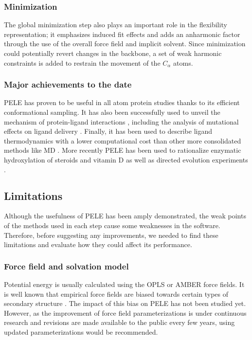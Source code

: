 \subsubsection{Minimization}

The global minimization step also plays an important role in the flexibility representation; it emphasizes induced fit effects and adds an anharmonic factor through the use of the overall force field and implicit solvent. Since minimization could potentially revert changes in the backbone, a set of weak harmonic constraints is added to restrain the movement of the $C_\alpha$ atoms.

\subsubsection{Major achievements to the date}

PELE has proven to be useful in all atom protein studies \cite{cossins_exploration_2012} thanks to its efficient conformational sampling. It has also been successfully used to unveil the mechanism of protein-ligand interactions \cite{hosseini_molecular_2013, fernandez-fueyo_structural_2014, linde_catalytic_2015}, including the analysis of mutational effects on ligand delivery \cite{hosseini_atomic_2014}. Finally, it has been used to describe ligand thermodynamics with a lower computational cost than other more consolidated methods like MD \cite{takahashi_monte_2014-1, edman_ligand_2015}. 
More recently PELE has been used to rationalize enzymatic hydroxylation of steroids \cite{babot_steroid_2015} and vitamin D \cite{lucas_molecular_2015-1} as well as directed evolution experiments \cite{jones_differential_2014}. 

\subsection{Limitations}

Although the usefulness of PELE has been amply demonstrated, the weak points of the methods used in each step cause some weaknesses in the software. Therefore, before suggesting any improvements, we needed to find these limitations and evaluate how they could affect its performance. 

\subsubsection{Force field and solvation model} 

Potential energy is usually calculated using the OPLS or AMBER force fields. It is well known that empirical force fields are biased towards certain types of  secondary structure  \cite{yildirim_benchmarking_2011, cino_comparison_2012, raval_refinement_2012}. The impact of this bias on PELE has not been studied yet. However, as the improvement of force field parameterizations is under continuous research and  revisions are made available to the public every few years, using updated parameterizations would be recommended.

